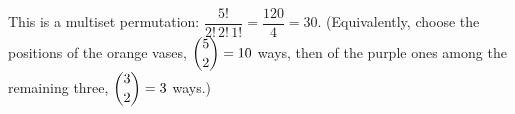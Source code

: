 This is a multiset permutation: $\dfrac{5!}{2!\,2!\,1!}=\dfrac{120}{4}=\boxed{30}$. (Equivalently, choose the positions of the orange vases, $\dbinom52=10$ ways, then of the purple ones among the remaining three, $\dbinom32=3$ ways.)
